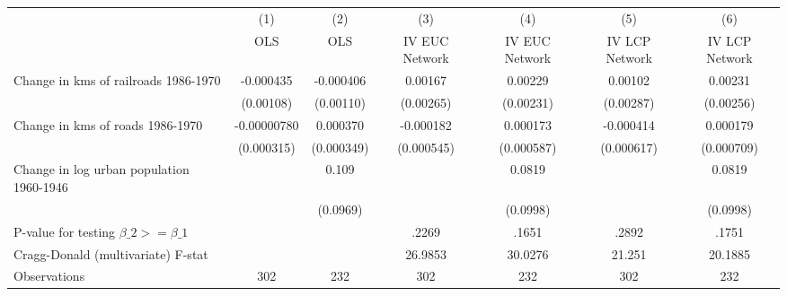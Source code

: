 {
\def\sym#1{\ifmmode^{#1}\else\(^{#1}\)\fi}
\begin{tabular}{l*{6}{c}}
\hline\hline
                &\multicolumn{1}{c}{(1)}&\multicolumn{1}{c}{(2)}&\multicolumn{1}{c}{(3)}&\multicolumn{1}{c}{(4)}&\multicolumn{1}{c}{(5)}&\multicolumn{1}{c}{(6)}\\
                &\multicolumn{1}{c}{OLS}&\multicolumn{1}{c}{OLS}&\multicolumn{1}{c}{IV EUC Network}&\multicolumn{1}{c}{IV EUC Network}&\multicolumn{1}{c}{IV LCP Network}&\multicolumn{1}{c}{IV LCP Network}\\
\hline
Change in kms of railroads 1986-1970&-0.000435         &-0.000406         &  0.00167         &  0.00229         &  0.00102         &  0.00231         \\
                &(0.00108)         &(0.00110)         &(0.00265)         &(0.00231)         &(0.00287)         &(0.00256)         \\
[1em]
Change in kms of roads 1986-1970&-0.00000780         & 0.000370         &-0.000182         & 0.000173         &-0.000414         & 0.000179         \\
                &(0.000315)         &(0.000349)         &(0.000545)         &(0.000587)         &(0.000617)         &(0.000709)         \\
[1em]
Change in log urban population 1960-1946&                  &    0.109         &                  &   0.0819         &                  &   0.0819         \\
                &                  & (0.0969)         &                  & (0.0998)         &                  & (0.0998)         \\
\hline
P-value for testing $\beta\_{2} >= \beta\_{1}$&                  &                  &    .2269         &    .1651         &    .2892         &    .1751         \\
Cragg-Donald (multivariate) F-stat&                  &                  &  26.9853         &  30.0276         &   21.251         &  20.1885         \\
Observations    &      302         &      232         &      302         &      232         &      302         &      232         \\
\hline\hline
\end{tabular}
}
